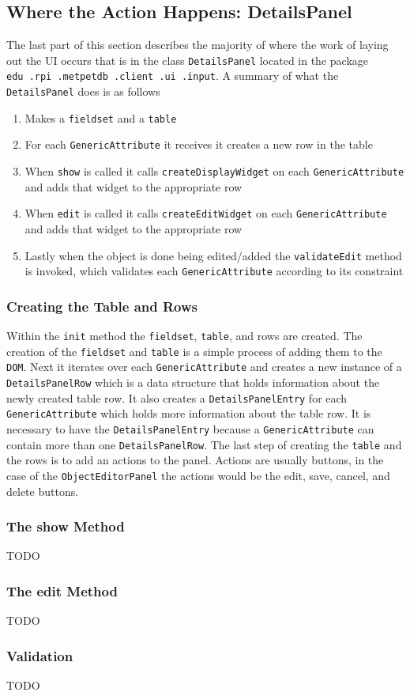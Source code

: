 \documentclass[10pt,letterpaper,onecolumn,oneside]{report}
\begin{document}
\subsection{Where the Action Happens: DetailsPanel}
The last part of this section describes the majority of where the work of laying out the UI
occurs that is in the class \texttt{DetailsPanel} located in the package 
\texttt{edu\ .rpi\ .metpetdb\ .client\ .ui\ .input}.
A summary of what the \texttt{DetailsPanel} does is as follows
\begin{enumerate}
\item Makes a \texttt{fieldset} and a \texttt{table}
\item For each \texttt{GenericAttribute} it receives it creates
a new row in the table
\item When \texttt{show} is called it calls \texttt{createDisplayWidget}
on each \texttt{GenericAttribute} and adds that widget to the appropriate row
\item When \texttt{edit} is called it calls \texttt{createEditWidget} on each
\texttt{GenericAttribute} and adds that widget to the appropriate row
\item Lastly when the object is done being edited/added the \texttt{validateEdit} 
method is invoked, which validates each \texttt{GenericAttribute} according to its
constraint
\end{enumerate}
\subsubsection{Creating the Table and Rows}
Within the \texttt{init} method the \texttt{fieldset}, \texttt{table}, and rows are
created.  The creation of the \texttt{fieldset} and \texttt{table} is a simple process
of adding them to the \texttt{DOM}.  Next it iterates over each \texttt{GenericAttribute}
and creates a new instance of a \texttt{DetailsPanelRow} which is a data structure that holds
information about the newly created table row.  It also creates a \texttt{DetailsPanelEntry}
for each \texttt{GenericAttribute} which holds more information about the table row.  It is
necessary to have the \texttt{DetailsPanelEntry} because a \texttt{GenericAttribute} can contain
more than one \texttt{DetailsPanelRow}.  The last step of creating the \texttt{table} and 
the rows is to add an actions to the panel.  Actions are usually buttons, in the case of the
\texttt{ObjectEditorPanel} the actions would be the edit, save, cancel, and delete buttons.
\subsubsection{The show Method}
TODO
\subsubsection{The edit Method}
TODO
\subsubsection{Validation}
TODO
\end{document}
